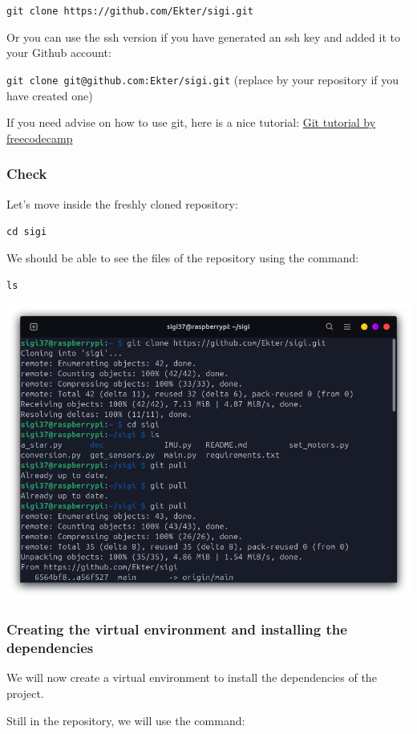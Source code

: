 \documentclass{article}
\begin{document}
\texttt{git clone https://github.com/Ekter/sigi.git}

Or you can use the ssh version if you have generated an ssh key and added it to your Github
account:

\texttt{git clone git@github.com:Ekter/sigi.git}
(replace by your repository if you have created one)

If you need advise on how to use git, here is a nice tutorial:
\href{https://www.freecodecamp.org/news/learn-the-basics-of-git-in-under-10-minutes-da548267cc91/
}{Git tutorial by freecodecamp}

\subsubsection{Check}

Let's move inside the freshly cloned repository:

\texttt{cd sigi}

We should be able to see the files of the repository using the command:

\texttt{ls}

\includegraphics[scale=0.37]{img/git_worked.png}

\subsubsection{Creating the virtual environment and installing the dependencies}

We will now create a virtual environment to install the dependencies of the project.

Still in the repository, we will use the command:
\end{document}
